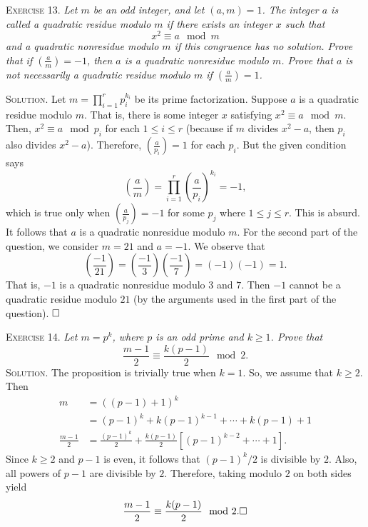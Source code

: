 \documentclass[11pt, leqno]{article}
\newcommand{\done}{\ensuremath{\hfill\square}}
\begin{document}
\textsc{Exercise 13}. \emph{Let $m$ be an odd integer, and let $(a,m) = 1$. The integer $a$ is called a quadratic residue modulo $m$ if there exists an integer $x$ such that 
\begin{displaymath}
x^2 \equiv a \mod m
\end{displaymath}
and a quadratic nonresidue modulo $m$ if this congruence has no solution. Prove that if $\left( \frac{a}{m} \right) = -1$, then $a$ is a quadratic nonresidue modulo $m$. Prove that $a$ is not necessarily a quadratic residue modulo $m$ if $\left( \frac{a}{m} \right) = 1$.}

\textsc{Solution}. Let $m = \prod_{i=1}^r p_i^{k_i}$ be its prime factorization. Suppose $a$ is a quadratic residue modulo $m$. That is, there is some integer $x$ satisfying $x^2 \equiv a \mod m$. Then, $x^2 \equiv a \mod p_i$ for each $1 \leq i \leq r$ (because if $m$ divides $x^2-a$, then $p_i$ also divides $x^2-a$). Therefore, $\left( \frac{a}{p_i} \right) = 1$ for each $p_i$. But the given condition says
\begin{displaymath}
\left( \frac{a}{m} \right) = \prod_{i=1}^r \left( \frac{a}{p_i} \right)^{k_i} = -1,
\end{displaymath}
which is true only when $\left( \frac{a}{p_j} \right) = -1$ for some $p_j$ where $1\leq j \leq r$. This is absurd. It follows that $a$ is a quadratic nonresidue modulo $m$. For the second part of the question, we consider $m = 21$ and $a=-1$. We observe that 
\begin{displaymath}
\left( \frac{-1}{21} \right) = \left( \frac{-1}{3} \right) \left( \frac{-1}{7} \right) = (-1)(-1) = 1.
\end{displaymath}
That is, $-1$ is a quadratic nonresidue modulo $3$ and $7$. Then $-1$ cannot be a quadratic residue modulo $21$ (by the arguments used in the first part of the question). \done

\textsc{Exercise 14}. \emph{Let $m = p^k$, where $p$ is an odd prime and $k\geq 1$. Prove that 
\begin{displaymath}
\frac{m-1}{2} \equiv \frac{k(p-1)}{2} \mod 2.
\end{displaymath}}\textsc{Solution}. The proposition is trivially true when $k=1$. So, we assume that $k\geq 2$. Then
\begin{align*}
  m &= ((p-1)+1)^k \\
    &= (p-1)^k + k(p-1)^{k-1} + \cdots + k(p-1) + 1 \\
  \frac{m-1}{2} &= \frac{(p-1)^k}{2} + \frac{k(p-1)}{2}[(p-1)^{k-2} + \cdots + 1].
\end{align*} Since $k\geq 2$ and $p-1$ is even, it follows that $(p-1)^k/2$ is divisible by $2$. Also, all powers of $p-1$ are divisible by $2$. Therefore, taking modulo $2$ on both sides yield 
\begin{displaymath}
\frac{m-1}{2} \equiv \frac{k(p-1)}{2} \mod 2.\done
\end{displaymath}
\end{document}
